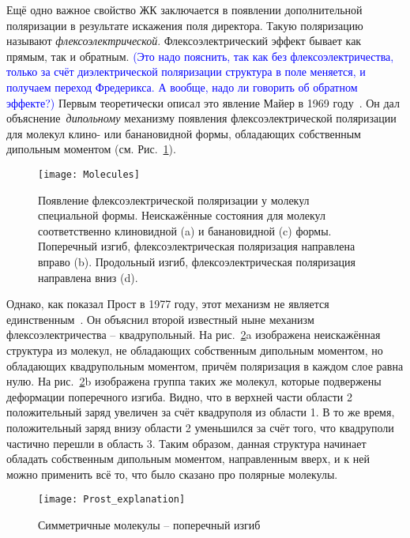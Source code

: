 Ещё одно важное свойство ЖК заключается в появлении дополнительной поляризации в результате искажения поля директора.
Такую поляризацию называют \textit{флексоэлектрической}.
Флексоэлектрический эффект бывает как прямым, так и обратным. 
\textcolor{blue}{(Это надо пояснить, так как без флексоэлектричества, только за счёт диэлектрической поляризации структура в поле меняется, и получаем переход Фредерикса. А вообще, надо ли говорить об обратном эффекте?)}
Первым теоретически описал это явление Майер в 1969 году~\cite{Meyer1969}.
Он дал объяснение~\textit{дипольному} механизму появления флексоэлектрической поляризации для молекул клино- или банановидной формы, обладающих собственным дипольным моментом (см. Рис.~\ref{pic-Meyer}). 

\begin{figure}[ht]
	\centering
	\texttt{[image: Molecules]}
	\caption{Появление флексоэлектрической поляризации у молекул специальной формы. Неискажённые состояния для молекул соответственно клиновидной (a) и банановидной (c) формы. Поперечный изгиб, флексоэлектрическая поляризация направлена вправо (b). Продольный изгиб, флексоэлектрическая поляризация направлена вниз (d).}
	\label{pic-Meyer}
\end{figure}

Однако, как показал Прост в 1977 году, этот механизм не является единственным~\cite{Prost77}.
Он объяснил второй известный ныне механизм флексоэлектричества -- квадрупольный.
На рис.~\ref{Prost_explanation}a изображена неискажённая структура из молекул, не обладающих собственным дипольным моментом, но обладающих квадрупольным моментом, причём поляризация в каждом слое равна нулю.
На рис.~\ref{Prost_explanation}b изображена группа таких же молекул, которые подвержены деформации поперечного изгиба.
Видно, что в верхней части области 2 положительный заряд увеличен за счёт квадруполя из области 1.
В то же время, положительный заряд внизу области 2 уменьшился за счёт того, что квадруполи частично перешли в область 3.
Таким образом, данная структура начинает обладать собственным дипольным моментом, направленным вверх, и к ней можно применить всё то, что было сказано про полярные молекулы.
\begin{figure}[ht]
	\centering
	\texttt{[image: Prost\_explanation]}
	\caption{Симметричные молекулы -- поперечный изгиб}
	\label{Prost_explanation}
\end{figure}

